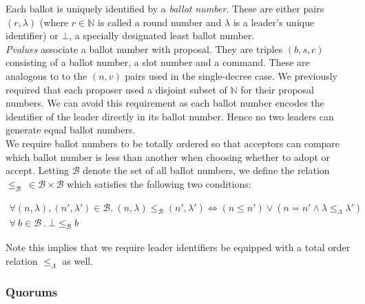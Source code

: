 Each ballot is uniquely identified by a \emph{ballot number}. These are either pairs $\left(r, \lambda\right)$ (where $r \in \mathbb{N}$ is called a round number and $\lambda$ is a leader's unique identifier) or $\bot$, a specially designated least ballot number. \\

\emph{Pvalues} associate a ballot number with proposal. They are triples $\left(b, s, c \right)$ consisting of a ballot number, a slot number and a command. These are analogous to to the $\left( n, v \right)$ pairs used in the single-decree case. We previously required that each proposer used a disjoint subset of $\mathbb{N}$ for their proposal numbers. We can avoid this requirement as each ballot number encodes the identifier of the leader directly in its ballot number. Hence no two leaders can generate equal ballot numbers.\\

We require ballot numbers to be totally ordered so that acceptors can compare which ballot number is less than another when choosing whether to adopt or accept. Letting $\mathcal{B}$ denote the set of all ballot numbers, we define the relation $\leq_{\mathcal{B}} \ \in \mathcal{B} \times \mathcal{B}$ which satisfies the following two conditions:

\begin{gather*}
  \forall \left( n, \lambda \right), \left( n', \lambda' \right) \in \mathcal{B} .
 \ \left( n, \lambda \right) \leq_{\mathcal{B}} \left( n', \lambda' \right) \iff
   \left ( n \leq n' \right) \vee \left( n = n' \wedge \lambda \leq_{\Lambda} \lambda' \right) \\
\forall \ b \in \mathcal{B} \ . \ \bot \leq_{\mathcal{B}} b
\end{gather*}  

Note this implies that we require leader identifiers be equipped with a total order relation  $\leq_{\Lambda}$ as well. \\

\subsubsection{Quorums}


